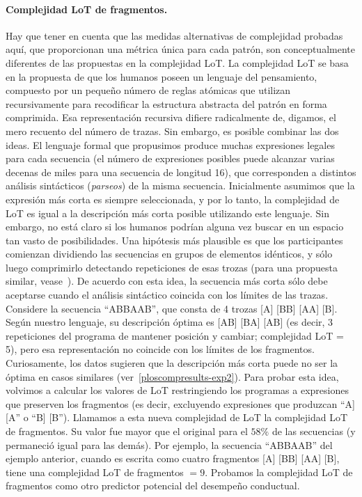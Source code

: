 \paragraph{Complejidad LoT de fragmentos.} Hay que tener en cuenta que las medidas alternativas de complejidad probadas aquí, que proporcionan una métrica única para cada patrón, son conceptualmente diferentes de las propuestas en la complejidad LoT. La complejidad LoT se basa en la propuesta de que los humanos poseen un lenguaje del pensamiento, compuesto por un pequeño número de reglas atómicas que utilizan recursivamente para recodificar la estructura abstracta del patrón en forma comprimida. Esa representación recursiva difiere radicalmente de, digamos, el mero recuento del número de trazas. Sin embargo, es posible combinar las dos ideas. El lenguaje formal que propusimos produce muchas expresiones legales para cada secuencia (el número de expresiones posibles puede alcanzar varias decenas de miles para una secuencia de longitud 16), que corresponden a distintos análisis sintácticos (\textit{parseos}) de la misma secuencia. Inicialmente asumimos que la expresión más corta es siempre seleccionada, y por lo tanto, la complejidad de LoT es igual a la descripción más corta posible utilizando este lenguaje. Sin embargo, no está claro si los humanos podrían alguna vez buscar en un espacio tan vasto de posibilidades. Una hipótesis más plausible es que los participantes comienzan dividiendo las secuencias en grupos de elementos idénticos, y sólo luego comprimirlo detectando repeticiones de esas trozas (para una propuesta similar, vease~\cite{f33,f49}). De acuerdo con esta idea, la secuencia más corta sólo debe aceptarse cuando el análisis sintáctico coincida con los límites de las trazas. Considere la secuencia ``ABBAAB'', que consta de 4 trozas [A] [BB] [AA] [B]. Según nuestro lenguaje, su descripción óptima es [AB] [BA] [AB] (es decir, 3 repeticiones del programa de mantener posición y cambiar; complejidad LoT = 5), pero esa representación no coincide con los límites de los fragmentos. Curiosamente, los datos sugieren que la descripción más corta puede no ser la óptima en casos similares (ver~\ref{ploscompresults-exp2}). Para probar esta idea, volvimos a calcular los valores de LoT restringiendo los programas a expresiones que preserven los fragmentos (es decir, excluyendo expresiones que produzcan ``A] [A'' o ``B] [B''). Llamamos a esta nueva complejidad de LoT la complejidad LoT de fragmentos. Su valor fue mayor que el original para el $58\%$ de las secuencias (y permaneció igual para las demás). Por ejemplo, la secuencia ``ABBAAB'' del ejemplo anterior, cuando es escrita como cuatro fragmentos [A] [BB] [AA] [B], tiene una complejidad LoT de fragmentos $= 9$. Probamos la complejidad LoT de fragmentos como otro predictor potencial del desempeño conductual.

